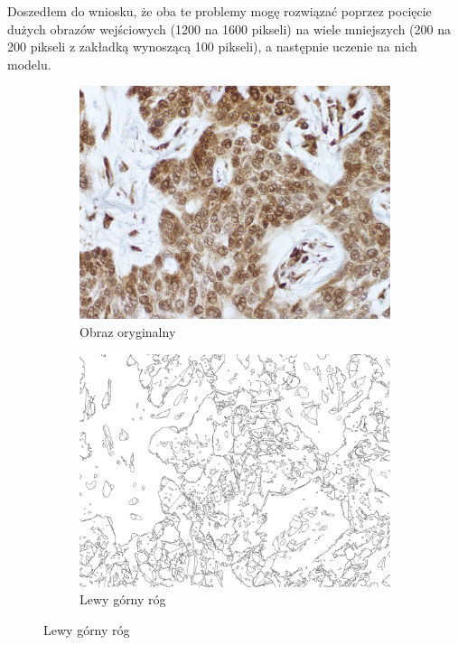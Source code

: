 \documentclass{article}
\begin{document}
Doszedłem do wniosku, że oba te problemy mogę rozwiązać poprzez pocięcie dużych obrazów wejściowych (1200 na 1600 pikseli) na wiele mniejszych (200 na 200 pikseli z zakładką wynoszącą 100 pikseli), a następnie uczenie na nich modelu.
\begin{figure}[H]
  \centering
  \begin{subfigure}{0.8\linewidth}
    \includegraphics[width=\linewidth]{images/input.png}
    \caption{Obraz oryginalny}
  \end{subfigure}
  \begin{subfigure}{0.4\linewidth}
    \includegraphics[width=\linewidth]{images/output.jpg}
    \caption{Lewy górny róg}
  \end{subfigure}

\end{figure}
\end{document}
